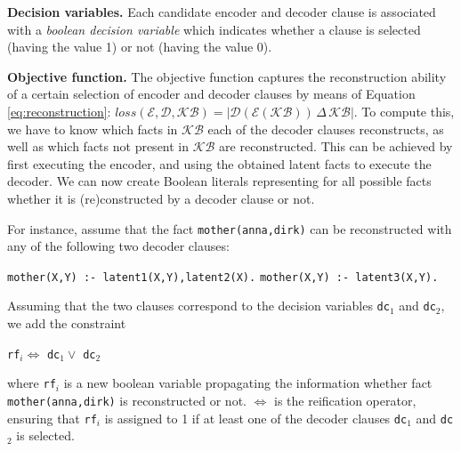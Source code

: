 \textbf{Decision variables.} 
Each candidate encoder and decoder clause is associated with a \textit{boolean decision variable} which indicates whether a clause is selected (having the value 1) or not (having the value 0).


\textbf{Objective function.}
The objective function captures the reconstruction ability of a certain selection of encoder and decoder clauses by means of Equation \ref{eq:reconstruction}: $loss(\mathcal{E},\mathcal{D},\mathcal{KB}) = | \mathcal{D}(\mathcal{E}(\mathcal{KB})) \, \Delta \, \mathcal{KB} |$.
To compute this, we have to know which facts in $\mathcal{KB}$ each of the decoder clauses reconstructs, as well as which facts not present in $\mathcal{KB}$ are reconstructed.
This can be achieved by first executing the encoder, and using the obtained latent facts to execute the decoder.
We can now create Boolean literals representing for all possible facts whether it is (re)constructed by a decoder clause or not.

For instance, assume that the fact \texttt{mother(anna,dirk)} can be reconstructed with any of the following two decoder clauses:
\begin{center}
	\texttt{mother(X,Y) :- latent1(X,Y),latent2(X).} \quad \texttt{mother(X,Y) :- latent3(X,Y).}
\end{center}

Assuming that the two clauses correspond to the decision variables \texttt{dc}$_1$ and \texttt{dc}$_2$, we add the constraint %

\begin{center}
\texttt{rf}$_i \Leftrightarrow$  \texttt{dc}$_1  \vee $ \texttt{dc}$_2$   
\end{center}

where \texttt{rf}$_i$ is a new boolean variable propagating the information whether fact \texttt{mother(anna,dirk)} is reconstructed or not. 
$\Leftrightarrow$ is the reification operator, ensuring that \texttt{rf}$_i$ is assigned to 1 if at least one of the decoder clauses \texttt{dc}$_1$ and \texttt{dc}$_2$ is selected.

